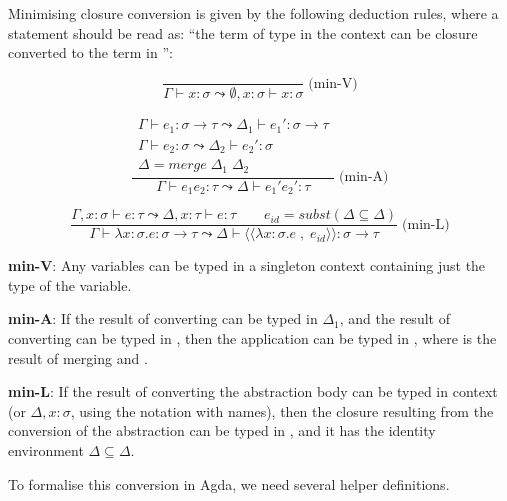 \documentclass[bsc,frontabs,oneside,singlespacing,parskip,deptreport]{infthesis}
\theoremstyle{definition}
\theoremstyle{lemma}
\begin{document}
Minimising closure conversion is given by the following deduction
rules, where a statement  should be read as:
``the term  of type  in the context  can be closure
converted to the term  in '':

\begin{minipage}{.5\textwidth}
  \[
    \frac
    {}
    {\Gamma \vdash x : \sigma \leadsto \emptyset , x : \sigma \vdash x : \sigma}
    \;\text{(min-V)}
  \]
\end{minipage}%
\begin{minipage}{.5\textwidth}
  \[
    \frac
    {
      \begin{matrix}
        \Gamma \vdash e_1 : \sigma \to \tau \leadsto \Delta_1 \vdash
        e_1' : \sigma \to \tau \\
        \Gamma \vdash e_2 : \sigma \leadsto \Delta_2 \vdash e_2' :
        \sigma \\
        \Delta = merge \; \Delta_1 \; \Delta_2
      \end{matrix}
      }
    {\Gamma ⊢ e_1 e_2 : \tau  \leadsto \Delta  \vdash e_1' e_2' : \tau}
     \;\text{(min-A)}
  \]
\end{minipage}

\[
  \frac {\Gamma , x : \sigma ⊢ e : \tau \leadsto \Delta , x : \tau
    \vdash e : \tau \quad \quad e_{id} = subst ( \Delta \subseteq
    \Delta )}
  {\Gamma \vdash \lambda x : \sigma . e : \sigma \to \tau \leadsto
    \Delta \vdash \langle\langle \lambda x : \sigma . e \; , \; e_{id}
    \rangle\rangle : \sigma \to \tau} \; \text{(min-L)}
\]

\textbf{min-V}: Any variables can be typed in a singleton context
containing just the type of the variable.

\textbf{min-A}: If the result  of converting  can be
typed in $\Delta_1$, and the result  of converting  can
be typed in , then the application  can be typed in
, where  is the result of merging  and .

\textbf{min-L}: If the result  of converting the abstraction
body  can be typed in context  (or
$\Delta, x : \sigma$, using the notation with names), then the closure
resulting from the conversion of the abstraction can be typed in
, and it has the identity environment $\Delta \subseteq \Delta$.

To formalise this conversion in Agda, we need several helper
definitions.
\end{document}
